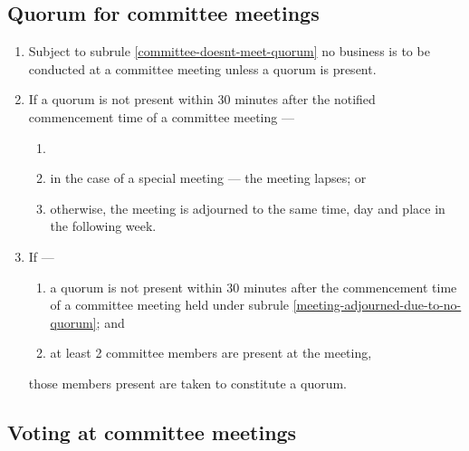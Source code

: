 \documentclass[../constitution.tex]{subfiles}
\begin{document}
\hypertarget{quorum-for-committee-meetings}{%
  \subsection{Quorum for committee meetings}\label{quorum-for-committee-meetings}}

\begin{enumerate}

  \item Subject to subrule \ref{committee-doesnt-meet-quorum} no business is to be conducted at a committee meeting unless a quorum is present.
  \item If a quorum is not present within 30 minutes after the notified commencement time of a committee meeting --- \label{no-quorum-after-30min}

        \begin{enumerate}

          \item
          \item in the case of a special meeting --- the meeting lapses; or
          \item otherwise, the meeting is adjourned to the same time, day and place in the following week. \label{meeting-adjourned-due-to-no-quorum}
        \end{enumerate}
  \item If ---

        \begin{enumerate}

          \item a quorum is not present within 30 minutes after the commencement time of a committee meeting held under subrule \ref{meeting-adjourned-due-to-no-quorum}; and
          \item at least 2 committee members are present at the meeting,
        \end{enumerate}

        those members present are taken to constitute a quorum.

\end{enumerate}

\hypertarget{voting-at-committee-meetings}{%
  \subsection{Voting at committee meetings}\label{voting-at-committee-meetings}}
\end{document}
